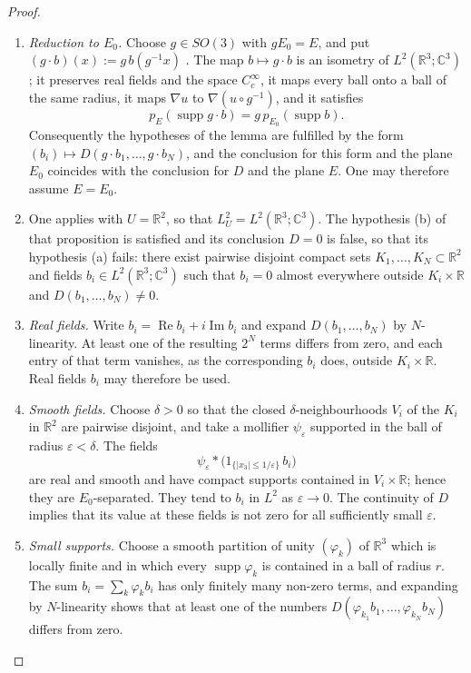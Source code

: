 \documentclass[11pt,letterpaper,reqno]{amsart}
\theoremstyle{definition}
\begin{document}
\begin{proof}
\begin{enumerate}
\item[1.] \emph{Reduction to $E_0$.}
Choose $g\in SO(3)$ with $gE_0=E$, and put $(g\cdot b)(x):=g\,b(g^{-1}x)$ \cite[Definition~14.1]{QEDII}.
The map $b\mapsto g\cdot b$ is an isometry of $L^2(\mathbb{R}^3;\mathbb{C}^3)$; it preserves real fields and the space $C_c^\infty$, it maps every ball onto a ball of the same radius, it maps $\nabla u$ to $\nabla(u\circ g^{-1})$, and it satisfies
\begin{equation*}
p_E(\operatorname{supp}g\cdot b)=g\,p_{E_0}(\operatorname{supp}b).
\end{equation*}
Consequently the hypotheses of the lemma are fulfilled by the form $(b_i)\mapsto D(g\cdot b_1,\dots,g\cdot b_N)$, and the conclusion for this form and the plane $E_0$ coincides with the conclusion for $D$ and the plane $E$.
One may therefore assume $E=E_0$.
\item[2.]
One applies \cite[Proposition~14.13]{QEDII} with $U=\mathbb{R}^2$, so that $L^2_U=L^2(\mathbb{R}^3;\mathbb{C}^3)$.
The hypothesis (b) of that proposition is satisfied and its conclusion $D=0$ is false, so that its hypothesis (a) fails: there exist pairwise disjoint compact sets $K_1,\dots,K_N\subset\mathbb{R}^2$ and fields $b_i\in L^2(\mathbb{R}^3;\mathbb{C}^3)$ such that $b_i=0$ almost everywhere outside $K_i\times\mathbb{R}$ and $D(b_1,\dots,b_N)\neq0$.
\item[3.] \emph{Real fields.}
Write $b_i=\operatorname{Re}b_i+i\operatorname{Im}b_i$ and expand $D(b_1,\dots,b_N)$ by $N$-linearity.
At least one of the resulting $2^N$ terms differs from zero, and each entry of that term vanishes, as the corresponding $b_i$ does, outside $K_i\times\mathbb{R}$.
Real fields $b_i$ may therefore be used.
\item[4.] \emph{Smooth fields.}
Choose $\delta>0$ so that the closed $\delta$-neighbourhoods $V_i$ of the $K_i$ in $\mathbb R^2$ are pairwise disjoint, and take a mollifier $\psi_\varepsilon$ supported in the ball of radius $\varepsilon<\delta$.
The fields
\begin{equation*}
\psi_\varepsilon*\bigl(1_{\{|x_3|\le1/\varepsilon\}}\,b_i\bigr)
\end{equation*}
are real and smooth and have compact supports contained in $V_i\times\mathbb{R}$; hence they are $E_0$-separated.
They tend to $b_i$ in $L^2$ as $\varepsilon\to0$.
The continuity of $D$ implies that its value at these fields is not zero for all sufficiently small $\varepsilon$.
\item[5.] \emph{Small supports.}
Choose a smooth partition of unity $(\varphi_k)$ of $\mathbb{R}^3$ which is locally finite and in which every $\operatorname{supp}\varphi_k$ is contained in a ball of radius $r$.
The sum $b_i=\sum_k\varphi_kb_i$ has only finitely many non-zero terms, and expanding by $N$-linearity shows that at least one of the numbers $D(\varphi_{k_1}b_1,\dots,\varphi_{k_N}b_N)$ differs from zero.
\end{enumerate}
\end{proof}
\end{document}
